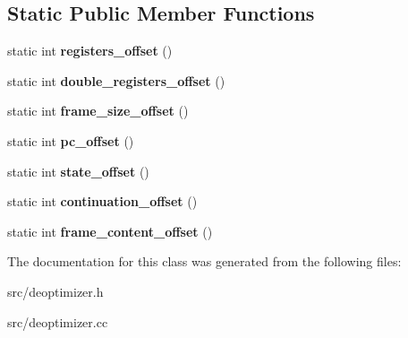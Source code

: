 \subsection*{Static Public Member Functions}
\begin{DoxyCompactItemize}
\item 
\hypertarget{classv8_1_1internal_1_1_frame_description_aca4e7553fe5d6b6ee5cde8e13ec0f83f}{}static int {\bfseries registers\+\_\+offset} ()\label{classv8_1_1internal_1_1_frame_description_aca4e7553fe5d6b6ee5cde8e13ec0f83f}

\item 
\hypertarget{classv8_1_1internal_1_1_frame_description_ad153c3c5f0a21b9bec32568e73d93d15}{}static int {\bfseries double\+\_\+registers\+\_\+offset} ()\label{classv8_1_1internal_1_1_frame_description_ad153c3c5f0a21b9bec32568e73d93d15}

\item 
\hypertarget{classv8_1_1internal_1_1_frame_description_a06dd3cd8ae0d2dfb9da60e5244ccce61}{}static int {\bfseries frame\+\_\+size\+\_\+offset} ()\label{classv8_1_1internal_1_1_frame_description_a06dd3cd8ae0d2dfb9da60e5244ccce61}

\item 
\hypertarget{classv8_1_1internal_1_1_frame_description_ade843b58760cc40ad09c3eb3d0376281}{}static int {\bfseries pc\+\_\+offset} ()\label{classv8_1_1internal_1_1_frame_description_ade843b58760cc40ad09c3eb3d0376281}

\item 
\hypertarget{classv8_1_1internal_1_1_frame_description_a885ed0fb1005c60ce5628571f605ef01}{}static int {\bfseries state\+\_\+offset} ()\label{classv8_1_1internal_1_1_frame_description_a885ed0fb1005c60ce5628571f605ef01}

\item 
\hypertarget{classv8_1_1internal_1_1_frame_description_a555ca7a3c4118a4bdff2936a7048754e}{}static int {\bfseries continuation\+\_\+offset} ()\label{classv8_1_1internal_1_1_frame_description_a555ca7a3c4118a4bdff2936a7048754e}

\item 
\hypertarget{classv8_1_1internal_1_1_frame_description_a6758b613b805fc441d2def08e7a5eabe}{}static int {\bfseries frame\+\_\+content\+\_\+offset} ()\label{classv8_1_1internal_1_1_frame_description_a6758b613b805fc441d2def08e7a5eabe}

\end{DoxyCompactItemize}


The documentation for this class was generated from the following files\+:\begin{DoxyCompactItemize}
\item 
src/deoptimizer.\+h\item 
src/deoptimizer.\+cc\end{DoxyCompactItemize}
